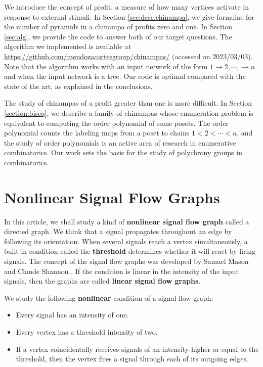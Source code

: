 \documentclass[a4paper]{article}\usepackage[english]{babel}
\theoremstyle{definition}
\renewcommand{\emph}[1]{\textbf{#1}}
\begin{document}
 We introduce the concept of profit, a measure of how many vertices activate in response to external stimuli. In Section \ref{sec:desc.chinampa}, we give formulae for the number of pyramids in a chinampa of profits zero and one. In  Section \ref{sec:alg}, we provide the code to answer both of our target questions. The algorithm we implemented is available at \url{https://github.com/mendozacortesgroup/chinampas/} ({accessed on 2023/03/03}). Note that the algorithm works with an input network of the form $1\rightarrow 2,\cdots,\rightarrow n$ and when the input network is a tree. Our code is optimal compared with the state of the art, as explained in the conclusions.

The study of chinampas of a profit greater than one is more difficult. In Section \ref{section:biseq}, we describe a family of chinampas whose enumeration problem is equivalent to computing the order polynomial of some posets. The order polynomial counts the labeling maps from a poset to chains $1<2<\cdots<n$, and the study of order polynomials is an active area of research in enumerative combinatorics. Our work sets the basis for the study of polychrony groups in combinatorics.

 
\section{Nonlinear Signal Flow Graphs}\label{sec:signal-flow}

In this article, we shall study a kind of \emph{{nonlinear signal flow graph}} %
called a directed graph. We think that a signal propagates throughout an edge by following its orientation. When several signals reach a vertex simultaneously, a built-in condition called the \emph{threshold} determines whether it will react by firing signals. The concept of the signal flow graphs was developed by Samuel Mason and Claude Shannon \cite{nonlineargraphs, sha}. If the condition is linear in the intensity of the input signals, then the graphs are called \emph{{linear signal flow graphs}}. 

 We study the following \emph{{nonlinear}} condition of a signal flow graph:

\begin{itemize}
\item Every signal has an intensity of one.
\item Every vertex has a threshold intensity of two.
\item If a vertex coincidentally receives signals of an intensity higher or equal to the threshold, then the vertex fires a signal through each of its outgoing edges.
\end{itemize}
\end{document}
